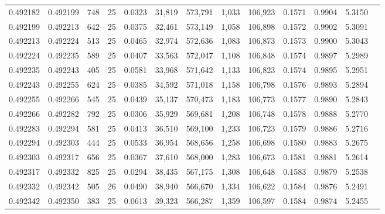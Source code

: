 \begin{tabular}{rrrrrrrrrrrrr}
0.492182 & 0.492199 &   748 &  25 &                                     0.0323 &  31,819 & 573,791 &   1,033 & 106,923 & 0.1571 & 0.9904 & 5.3150 \\
0.492199 & 0.492213 &   642 &  25 &                                     0.0375 &  32,461 & 573,149 &   1,058 & 106,898 & 0.1572 & 0.9902 & 5.3091 \\
0.492213 & 0.492224 &   513 &  25 &                                     0.0465 &  32,974 & 572,636 &   1,083 & 106,873 & 0.1573 & 0.9900 & 5.3043 \\
0.492224 & 0.492235 &   589 &  25 &                                     0.0407 &  33,563 & 572,047 &   1,108 & 106,848 & 0.1574 & 0.9897 & 5.2989 \\
0.492235 & 0.492243 &   405 &  25 &                                     0.0581 &  33,968 & 571,642 &   1,133 & 106,823 & 0.1574 & 0.9895 & 5.2951 \\
0.492243 & 0.492255 &   624 &  25 &                                     0.0385 &  34,592 & 571,018 &   1,158 & 106,798 & 0.1576 & 0.9893 & 5.2894 \\
0.492255 & 0.492266 &   545 &  25 &                                     0.0439 &  35,137 & 570,473 &   1,183 & 106,773 & 0.1577 & 0.9890 & 5.2843 \\
0.492266 & 0.492282 &   792 &  25 &                                     0.0306 &  35,929 & 569,681 &   1,208 & 106,748 & 0.1578 & 0.9888 & 5.2770 \\
0.492283 & 0.492294 &   581 &  25 &                                     0.0413 &  36,510 & 569,100 &   1,233 & 106,723 & 0.1579 & 0.9886 & 5.2716 \\
0.492294 & 0.492303 &   444 &  25 &                                     0.0533 &  36,954 & 568,656 &   1,258 & 106,698 & 0.1580 & 0.9883 & 5.2675 \\
0.492303 & 0.492317 &   656 &  25 &                                     0.0367 &  37,610 & 568,000 &   1,283 & 106,673 & 0.1581 & 0.9881 & 5.2614 \\
0.492317 & 0.492332 &   825 &  25 &                                     0.0294 &  38,435 & 567,175 &   1,308 & 106,648 & 0.1583 & 0.9879 & 5.2538 \\
0.492332 & 0.492342 &   505 &  26 &                                     0.0490 &  38,940 & 566,670 &   1,334 & 106,622 & 0.1584 & 0.9876 & 5.2491 \\
0.492342 & 0.492350 &   383 &  25 &                                     0.0613 &  39,323 & 566,287 &   1,359 & 106,597 & 0.1584 & 0.9874 & 5.2455 \\

\end{tabular}
